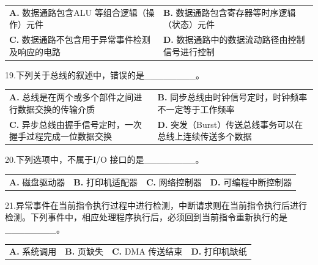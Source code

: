 \documentclass[UTF8,11pt]{ctexart}
\begin{document}
\begin{center}\begin{tabular}{>{\raggedright\arraybackslash}p{\dimexpr(\linewidth-4\tabcolsep)/2\relax}>{\raggedright\arraybackslash}p{\dimexpr(\linewidth-4\tabcolsep)/2\relax}}
\textbf{A.} 数据通路包含ALU 等组合逻辑（操作）元件 & \textbf{B.} 数据通路包含寄存器等时序逻辑（状态）元件\\[.35em]
\textbf{C.} 数据通路不包含用于异常事件检测及响应的电路 & \textbf{D.} 数据通路中的数据流动路径由控制信号进行控制\\[.35em]\end{tabular}\end{center}

19.下列关于总线的叙述中，错误的是\_\_\_\_\_\_\_\_。


\begin{center}\begin{tabular}{>{\raggedright\arraybackslash}p{\dimexpr(\linewidth-4\tabcolsep)/2\relax}>{\raggedright\arraybackslash}p{\dimexpr(\linewidth-4\tabcolsep)/2\relax}}
\textbf{A.} 总线是在两个或多个部件之间进行数据交换的传输介质 & \textbf{B.} 同步总线由时钟信号定时，时钟频率不一定等于工作频率\\[.35em]
\textbf{C.} 异步总线由握手信号定时，一次握手过程完成一位数据交换 & \textbf{D.} 突发（Burst）传送总线事务可以在总线上连续传送多个数据\\[.35em]\end{tabular}\end{center}

20.下列选项中，不属于I/O 接口的是\_\_\_\_\_\_\_\_。


\begin{center}\begin{tabular}{>{\raggedright\arraybackslash}p{\dimexpr(\linewidth-8\tabcolsep)/4\relax}>{\raggedright\arraybackslash}p{\dimexpr(\linewidth-8\tabcolsep)/4\relax}>{\raggedright\arraybackslash}p{\dimexpr(\linewidth-8\tabcolsep)/4\relax}>{\raggedright\arraybackslash}p{\dimexpr(\linewidth-8\tabcolsep)/4\relax}}
\textbf{A.} 磁盘驱动器 & \textbf{B.} 打印机适配器 & \textbf{C.} 网络控制器 & \textbf{D.} 可编程中断控制器\\[.35em]\end{tabular}\end{center}

21.异常事件在当前指令执行过程中进行检测，中断请求则在当前指令执行后进行检测。下列事件中，相应处理程序执行后，必须回到当前指令重新执行的是\_\_\_\_\_\_\_\_。


\begin{center}\begin{tabular}{>{\raggedright\arraybackslash}p{\dimexpr(\linewidth-8\tabcolsep)/4\relax}>{\raggedright\arraybackslash}p{\dimexpr(\linewidth-8\tabcolsep)/4\relax}>{\raggedright\arraybackslash}p{\dimexpr(\linewidth-8\tabcolsep)/4\relax}>{\raggedright\arraybackslash}p{\dimexpr(\linewidth-8\tabcolsep)/4\relax}}
\textbf{A.} 系统调用 & \textbf{B.} 页缺失 & \textbf{C.} DMA 传送结束 & \textbf{D.} 打印机缺纸\\[.35em]\end{tabular}\end{center}
\end{document}
